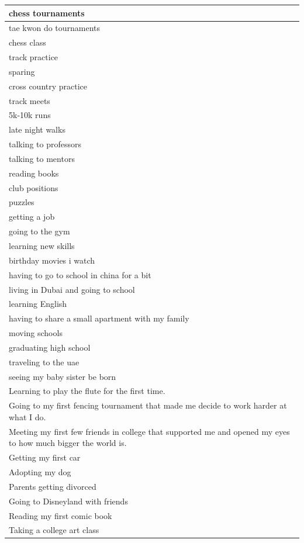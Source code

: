 \documentclass[
  .7em,
  letterpaper,
  DIV=11,
  numbers=noendperiod]{scrartcl}
\begin{document}
\begin{table}
\begin{tabular}{l}
\hline
chess tournaments\\
\hline
tae kwon do tournaments\\
\hline
chess class\\
\hline
track practice\\
\hline
sparing\\
\hline
cross country practice\\
\hline
track meets\\
\hline
5k-10k runs\\
\hline
late night walks\\
\hline
talking to professors\\
\hline
talking to mentors\\
\hline
reading books\\
\hline
club positions\\
\hline
puzzles\\
\hline
getting a job\\
\hline
going to the gym\\
\hline
learning new skills\\
\hline
birthday movies i watch\\
\hline
having to go to school in china for a bit\\
\hline
living in Dubai and going to school\\
\hline
learning English\\
\hline
having to share a small apartment with my family\\
\hline
moving schools\\
\hline
graduating high school\\
\hline
traveling to the uae\\
\hline
seeing my baby sister be born\\
\hline
Learning to play the flute for the first time.\\
\hline
Going to my first fencing tournament that made me decide to work harder at what I do.\\
\hline
Meeting my first few friends in college that supported me and opened my eyes to how much bigger the world is.\\
\hline
Getting my first car\\
\hline
Adopting my dog\\
\hline
Parents getting divorced\\
\hline
Going to Disneyland with friends\\
\hline
Reading my first comic book\\
\hline
Taking a college art class\\

\end{tabular}
\end{table}
\end{document}
